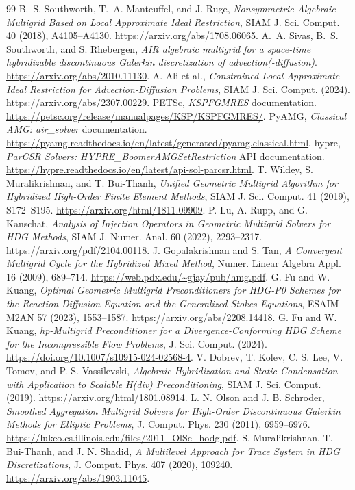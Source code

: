 \documentclass[11pt]{article}
\numberwithin{equation}{section}
\numberwithin{figure}{section}
\numberwithin{table}{section}
\begin{document}
\begin{thebibliography}{99}
 B.~S. Southworth, T.~A. Manteuffel, and J. Ruge,
\emph{Nonsymmetric Algebraic Multigrid Based on Local Approximate Ideal
Restriction}, SIAM J. Sci. Comput. 40 (2018), A4105--A4130.
\url{https://arxiv.org/abs/1708.06065}.
 A.~A. Sivas, B.~S. Southworth, and S. Rhebergen,
\emph{AIR algebraic multigrid for a space-time hybridizable discontinuous
Galerkin discretization of advection(-diffusion)}.
\url{https://arxiv.org/abs/2010.11130}.
 A. Ali et al.,
\emph{Constrained Local Approximate Ideal Restriction for Advection-Diffusion
Problems}, SIAM J. Sci. Comput. (2024).
\url{https://arxiv.org/abs/2307.00229}.
 PETSc, \emph{KSPFGMRES} documentation.
\url{https://petsc.org/release/manualpages/KSP/KSPFGMRES/}.
 PyAMG, \emph{Classical AMG: air\_solver} documentation.
\url{https://pyamg.readthedocs.io/en/latest/generated/pyamg.classical.html}.
 hypre, \emph{ParCSR Solvers:
HYPRE\_BoomerAMGSetRestriction} API documentation.
\url{https://hypre.readthedocs.io/en/latest/api-sol-parcsr.html}.
 T. Wildey, S. Muralikrishnan, and T. Bui-Thanh,
\emph{Unified Geometric Multigrid Algorithm for Hybridized High-Order
Finite Element Methods}, SIAM J. Sci. Comput. 41 (2019), S172--S195.
\url{https://arxiv.org/html/1811.09909}.
 P. Lu, A. Rupp, and G. Kanschat,
\emph{Analysis of Injection Operators in Geometric Multigrid Solvers for
HDG Methods}, SIAM J. Numer. Anal. 60 (2022), 2293--2317.
\url{https://arxiv.org/pdf/2104.00118}.
 J. Gopalakrishnan and S. Tan,
\emph{A Convergent Multigrid Cycle for the Hybridized Mixed Method},
Numer. Linear Algebra Appl. 16 (2009), 689--714.
\url{https://web.pdx.edu/~gjay/pub/hmg.pdf}.
 G. Fu and W. Kuang,
\emph{Optimal Geometric Multigrid Preconditioners for HDG-P0 Schemes
for the Reaction-Diffusion Equation and the Generalized Stokes Equations},
ESAIM M2AN 57 (2023), 1553--1587.
\url{https://arxiv.org/abs/2208.14418}.
 G. Fu and W. Kuang,
\emph{hp-Multigrid Preconditioner for a Divergence-Conforming HDG Scheme
for the Incompressible Flow Problems}, J. Sci. Comput. (2024).
\url{https://doi.org/10.1007/s10915-024-02568-4}.
 V. Dobrev, T. Kolev, C. S. Lee, V. Tomov, and P. S. Vassilevski,
\emph{Algebraic Hybridization and Static Condensation with Application
to Scalable H(div) Preconditioning}, SIAM J. Sci. Comput. (2019).
\url{https://arxiv.org/html/1801.08914}.
 L. N. Olson and J. B. Schroder,
\emph{Smoothed Aggregation Multigrid Solvers for High-Order Discontinuous
Galerkin Methods for Elliptic Problems}, J. Comput. Phys. 230 (2011), 6959--6976.
\url{https://lukeo.cs.illinois.edu/files/2011_OlSc_hodg.pdf}.
 S. Muralikrishnan, T. Bui-Thanh, and J. N. Shadid,
\emph{A Multilevel Approach for Trace System in HDG Discretizations},
J. Comput. Phys. 407 (2020), 109240.
\url{https://arxiv.org/abs/1903.11045}.
\end{thebibliography}
\end{document}
